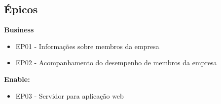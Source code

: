 \subsection{Épicos}
\textbf{Business}
\begin{itemize}
\item {EP01 - Informações sobre membros da empresa}
\item {EP02 - Acompanhamento do desempenho de membros da empresa}
\end{itemize}

\textbf{Enable:}
\begin{itemize}
\item {EP03 - Servidor para aplicação web}
\end{itemize}
